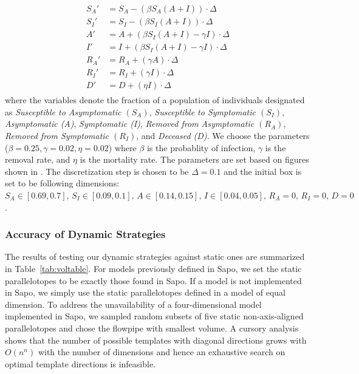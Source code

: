 \begin{align}
  \begin{split}
   S_A' & = S_A  -(\beta S_A(A+I))\cdot \Delta \\
   S_I' & = S_I  -(\beta S_I (A + I))\cdot \Delta \\
   A' & = A + (\beta S_I(A+I) - \gamma I)\cdot \Delta \\
   I' & = I + (\beta S_I (A+I) - \gamma I)\cdot  \Delta \\
   R_A' & = R_A + (\gamma A)\cdot \Delta \\
   R_I' & = R_I + (\gamma I)\cdot \Delta \\
   D' & = D + (\eta I)\cdot \Delta
  \end{split}
\end{align}
where the variables denote the fraction of a population of individuals designated as \emph{Susceptible to Asymptomatic $(S_A)$}, \emph{Susceptible to Symptomatic $(S_I)$}, \emph{Asymptomatic (A)}, \emph{Symptomatic (I)}, \emph{Removed from Asymptomatic $(R_A)$}, \emph{Removed from Symptomatic $(R_I)$}, and \emph{Deceased (D)}. We choose the parameters ($\beta = 0.25, \gamma=0.02, \eta=0.02$) where $\beta$ is the probablity of infection, $\gamma$ is the removal rate, and $\eta$ is the mortality rate. The parameters are set based on figures shown in \cite{ansumali2020modelling}. The discretization step is chosen to be $\Delta = 0.1$ and the initial box is set to be following dimensions: $S_A  \in [0.69, 0.7], \, S_I \in [0.09, 0.1], \, A \in [0.14, 0.15], \, I \in [0.04, 0.05], \, R_A  = 0,\, R_I  = 0, \, D  = 0$.

\vspace{-1em}
\subsubsection{Accuracy of Dynamic Strategies}
The results of testing our dynamic strategies against static ones are summarized in Table~\ref{tab:voltable}. For models previously defined in Sapo, we set the static parallelotopes to be exactly those found in Sapo.
If a model is not implemented in Sapo, we simply use the static parallelotopes defined in a model of equal dimension. To address the unavailability of a four-dimensional model implemented in Sapo, we sampled random subsets of five static non-axis-aligned parallelotopes and chose the flowpipe with smallest volume.
%
%
A cursory analysis shows that the number of possible templates with diagonal directions grows with $O(n^n)$ with the number of dimensions and hence an exhaustive search on optimal template directions is infeasible.

